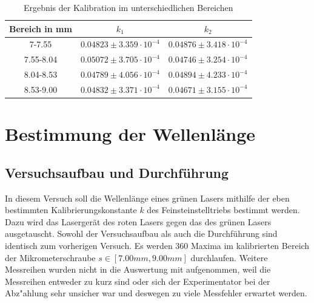 \documentclass[12pt,a4paper]{article}
\begin{document}
\begin{table}[H]
	\centering
	\begin{tabular}{|c|c|c|}
		\hline 
		Bereich in mm&$k_1$&$k_2$  \\ 
		\hline 
		7-7.55 &$0.04823\pm3.359 \cdot 10^{-4}$ &$0.04876\pm3.418 \cdot 10^{-4}$  \\ 
		\hline 
		7.55-8.04&$0.05072\pm3.705 \cdot 10^{-4}$ &$0.04746\pm3.254 \cdot 10^{-4}$ \\ 
		\hline 
		8.04-8.53&$0.04789\pm4.056 \cdot 10^{-4}$ &$0.04894\pm4.233 \cdot 10^{-4}$ \\ 
		\hline 
		8.53-9.00&$0.04832\pm3.371 \cdot 10^{-4}$ &$0.04671\pm3.155 \cdot 10^{-4}$ \\ 
		\hline 
	\end{tabular} 
	\caption{Ergebnis der Kalibration im unterschiedlichen Bereichen}
	\label{table:kalib}
\end{table} 

\section{Bestimmung der Wellenlänge}
\subsection{Versuchsaufbau und Durchführung}
In diesem Versuch soll die Wellenlänge eines grünen Lasers mithilfe der eben bestimmten Kalibrierungskonstante $k$ des Feinsteinstelltriebs bestimmt werden. Dazu wird das Lasergerät des roten Lasers gegen das des grünen Lasers ausgetauscht. Sowohl der Versuchsaufbau als auch die Durchführung sind identisch zum vorherigen Versuch. Es werden 360 Maxima im kalibrierten Bereich der Mikrometerschraube $s\in[7.00mm,9.00mm]$ durchlaufen.
Weitere Messreihen wurden nicht in die Auswertung mit aufgenommen, weil die Messreihen entweder zu kurz sind oder sich der Experimentator bei der Abz"ahlung sehr unsicher war und deswegen zu viele Messfehler erwartet werden.
\end{document}
